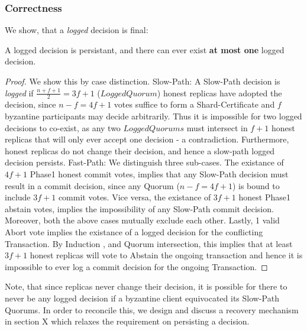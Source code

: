 \subsubsection{Correctness}
We show, that a \textit{logged} decision is final:
\begin{theorem}[Saf]
A logged decision is persistant, and there can ever exist \textbf{at most one} logged decision.
\end{theorem}
\begin{proof}
We show this by case distinction. Slow-Path: A Slow-Path decision is \textit{logged} if $\frac{n+f+1}{2} = 3f+1$ ($LoggedQuorum$) honest replicas have adopted the decision, since $n-f = 4f+1$ votes suffice to form a Shard-Certificate and $f$ byzantine participants may decide arbitrarily. Thus it is impossible for two logged decisions to co-exist, as any two $LoggedQuorums$ must intersect in $f+1$ honest replicas that will only ever accept one decision - a contradiction. Furthermore, honest replicas do not change their decision, and hence a slow-path logged decision persists. Fast-Path: We distinguish three sub-cases. The existance of $4f+1$ Phase1 honest commit votes, implies that any Slow-Path decision must result in a commit decision, since any Quorum ($n-f = 4f+1$) is bound to include $3f+1$ commit votes. Vice versa, the existance of $3f+1$ honest Phase1 abstain votes, implies the impossibility of any Slow-Path commit decision. Moreover, both the above cases mutually exclude each other. Lastly, 1 valid Abort vote implies the existance of a logged decision for the conflicting Transaction. By Induction , and Quorum intersection, this implies that at least $3f+1$ honest replicas will vote to Abstain the ongoing transaction and hence it is impossible to ever log a commit decision for the ongoing Transaction.
\end{proof} 

Note, that since replicas never change their decision, it is possible for there to never be any logged decision if a byzantine client equivocated its Slow-Path Quorums. In order to reconcile this, we design and discuss a recovery mechanism in section X which relaxes the requirement on persisting a decision.  


